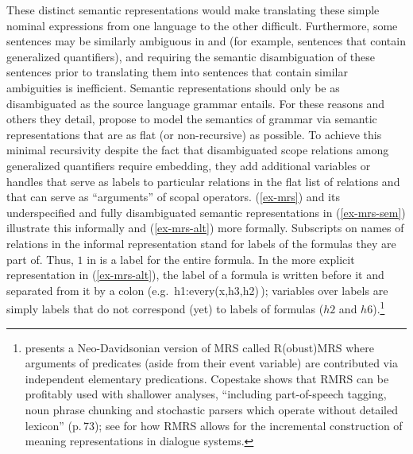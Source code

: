 \documentclass[output=paper,biblatex,babelshorthands,newtxmath,draftmode,colorlinks,citecolor=brown]{langscibook}
\begin{document}
These distinct semantic representations would make translating these simple nominal expressions from one language to the other difficult. Furthermore, some sentences may be similarly ambiguous in  and  (for example, sentences that contain generalized quantifiers), and requiring the semantic disambiguation of these sentences prior to translating them into sentences that contain similar ambiguities is inefficient. Semantic representations should only be as disambiguated as the source language grammar entails. For these reasons and others they detail, \citet{Copestakeetal1995} propose to model the semantics of grammar via semantic representations that are as flat (or non-recursive) as possible. To achieve this minimal recursivity despite the fact that disambiguated scope relations among generalized quantifiers require embedding, they add additional variables or handles that serve as labels to particular relations in the flat list of relations and that can serve as ``arguments'' of scopal operators. (\ref{ex-mrs}) and its underspecified and fully disambiguated semantic representations in (\ref{ex-mrs-sem}) illustrate this informally and (\ref{ex-mrs-alt}) more formally. Subscripts on names of relations in the informal representation stand for labels of the formulas they are part of. Thus, $1$ in  is a label for the entire formula. In the more explicit representation in (\ref{ex-mrs-alt}), the label of a formula is written before it and separated from it by a colon (e.g.\ h1:every(x,h3,h2)\,); 
variables over labels are simply labels that do not correspond (yet) to labels of formulas ($h2$ and $h6$).\footnote{\citet{Copestake2007} presents a Neo-Davidsonian version of MRS called R(obust)MRS where arguments of predicates (aside from their event variable) are contributed via independent elementary predications. Copestake shows that RMRS can be profitably used with shallower analyses, ``including part-of-speech tagging, noun phrase chunking and stochastic parsers which operate without detailed lexicon'' (p.\,73); see \citet{PeldzusandSchlangen2012} for how RMRS allows for the incremental construction of meaning representations in dialogue systems.}
\end{document}
